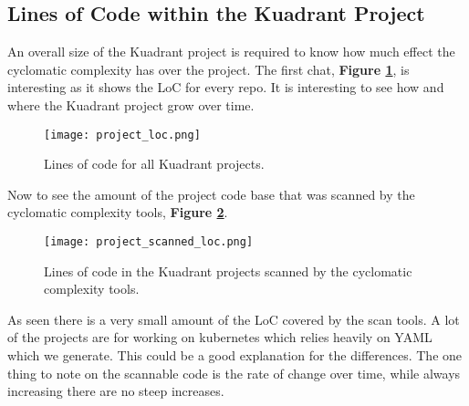 \subsection{Lines of Code within the Kuadrant Project}
An overall size of the Kuadrant project is required to know how much effect the cyclomatic complexity has over the project.
The first chat, \textbf{Figure \ref{fig:project_loc}}, is interesting as it shows the LoC for every repo.
It is interesting to see how and where the Kuadrant project grow over time.

\begin{figure}
	\texttt{[image: project\_loc.png]}
	\caption{Lines of code for all Kuadrant projects.}
	\label{fig:project_loc}
\end{figure}

Now to see the amount of the project code base that was scanned by the cyclomatic complexity tools, \textbf{Figure \ref{fig:project_scanned_loc}}.

\begin{figure}
	\texttt{[image: project\_scanned\_loc.png]}
	\caption{Lines of code in the Kuadrant projects scanned by the cyclomatic complexity tools.}
	\label{fig:project_scanned_loc}
\end{figure}

As seen there is a very small amount of the LoC covered by the scan tools.
A lot of the projects are for working on kubernetes which relies heavily on YAML which we generate.
This could be a good explanation for the differences.
The one thing to note on the scannable code is the rate of change over time, while always increasing there are no steep increases.

